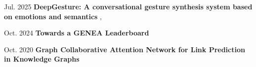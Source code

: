\begin{samepage}
	
\begin{twocolentry}{Jul. 2025}
	\textbf{DeepGesture: A conversational gesture synthesis system based on
		emotions and semantics} , 
	
	\vspace{0.10 cm}
\end{twocolentry}


\begin{twocolentry}{Oct. 2024}
	\textbf{Towards a GENEA Leaderboard} 
	
	\vspace{0.10 cm}
	
\end{twocolentry}


\begin{twocolentry}{Oct. 2020}
	\textbf{Graph Collaborative Attention Network for Link Prediction in Knowledge Graphs} 
	\vspace{0.10 cm}
	
\end{twocolentry}
\end{samepage}